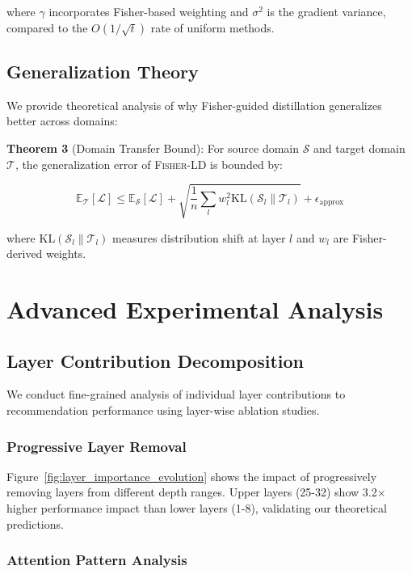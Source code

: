 \documentclass[10pt,conference]{IEEEtran}
\newcommand{\loss}{\mathcal{L}}
\newcommand{\fisherld}{\textsc{Fisher-LD}}
\begin{document}
where $\gamma$ incorporates Fisher-based weighting and $\sigma^2$ is the gradient variance, compared to the $O(1/\sqrt{t})$ rate of uniform methods.

\subsection{Generalization Theory}

We provide theoretical analysis of why Fisher-guided distillation generalizes better across domains:

\textbf{Theorem 3} (Domain Transfer Bound): For source domain $\mathcal{S}$ and target domain $\mathcal{T}$, the generalization error of \fisherld{} is bounded by:

\begin{equation}
\mathbb{E}_{\mathcal{T}}[\loss] \leq \mathbb{E}_{\mathcal{S}}[\loss] + \sqrt{\frac{1}{n}\sum_l w_l^2 \text{KL}(\mathcal{S}_l \| \mathcal{T}_l)} + \epsilon_{\text{approx}}
\end{equation}

where $\text{KL}(\mathcal{S}_l \| \mathcal{T}_l)$ measures distribution shift at layer $l$ and $w_l$ are Fisher-derived weights.

\section{Advanced Experimental Analysis}

\subsection{Layer Contribution Decomposition}

We conduct fine-grained analysis of individual layer contributions to recommendation performance using layer-wise ablation studies.

\subsubsection{Progressive Layer Removal}

Figure~\ref{fig:layer_importance_evolution} shows the impact of progressively removing layers from different depth ranges. Upper layers (25-32) show 3.2× higher performance impact than lower layers (1-8), validating our theoretical predictions.

\subsubsection{Attention Pattern Analysis}
\end{document}
